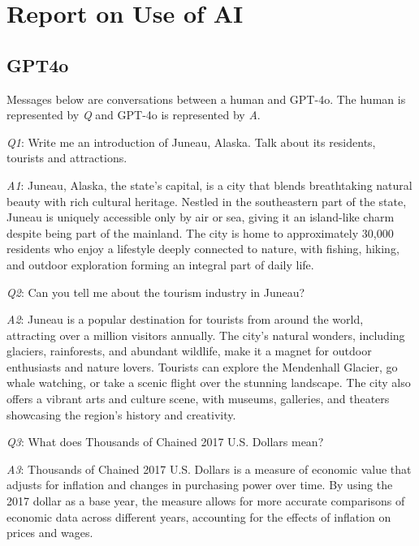 \section*{\centering Report on Use of AI}

\subsection*{GPT4o}

Messages below are conversations between a human and GPT-4o. The human is represented by \textit{Q} and GPT-4o is represented by \textit{A}.

\vspace{0.5cm}

\textit{Q1}: Write me an introduction of Juneau, Alaska. Talk about its residents, tourists and attractions.

\textit{A1}: Juneau, Alaska, the state’s capital, is a city that blends breathtaking natural beauty with rich cultural heritage. Nestled in the southeastern part of the state, Juneau is uniquely accessible only by air or sea, giving it an island-like charm despite being part of the mainland. The city is home to approximately 30,000 residents who enjoy a lifestyle deeply connected to nature, with fishing, hiking, and outdoor exploration forming an integral part of daily life.

\vspace{0.5cm}

\textit{Q2}: Can you tell me about the tourism industry in Juneau?

\textit{A2}: Juneau is a popular destination for tourists from around the world, attracting over a million visitors annually. The city’s natural wonders, including glaciers, rainforests, and abundant wildlife, make it a magnet for outdoor enthusiasts and nature lovers. Tourists can explore the Mendenhall Glacier, go whale watching, or take a scenic flight over the stunning landscape. The city also offers a vibrant arts and culture scene, with museums, galleries, and theaters showcasing the region’s history and creativity.

\vspace{0.5cm}

\textit{Q3}: What does Thousands of Chained 2017 U.S. Dollars mean?

\textit{A3}: Thousands of Chained 2017 U.S. Dollars is a measure of economic value that adjusts for inflation and changes in purchasing power over time. By using the 2017 dollar as a base year, the measure allows for more accurate comparisons of economic data across different years, accounting for the effects of inflation on prices and wages.

